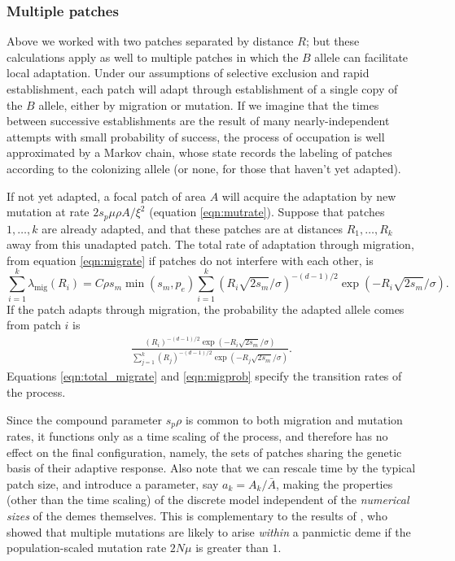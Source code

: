 \documentclass{article}
\newcommand{\linelabel}[1]{}
\newcommand{\migrate}{\lambda_\text{mig}}
\begin{document}
\subsubsection{Multiple patches}
Above we worked with two patches separated by distance $R$;
but these calculations apply as well to multiple patches
in which the $B$ allele can facilitate local adaptation. 
Under our assumptions of selective exclusion and rapid establishment, 
each patch will adapt through establishment of a single copy of the $B$ allele, 
either by migration or mutation.
If we imagine that the times between successive establishments are the result of many nearly-independent attempts
with small probability of success,
the process of occupation is well approximated by a Markov chain,
whose state records the labeling of patches according to the colonizing allele
(or none, for those that haven't yet adapted).

If not yet adapted, a focal patch of area $A$ will acquire the adaptation by new mutation at rate $2 s_p \mu \rho A/\xi^2$ (equation \eqref{eqn:mutrate}).
Suppose that patches $1, \ldots, k$ are already adapted,
and that these patches are at distances $R_1, \ldots, R_k$ away from this unadapted patch.
The total rate of adaptation through migration, from equation \eqref{eqn:migrate}
if patches do not interfere with each other, \linelabel{rr:interference}
is
\begin{equation} \label{eqn:total_migrate}
    \sum_{i=1}^k \migrate(R_i) = C \rho s_m \min(s_m,p_e) \sum_{i=1}^{k} \left(R_i \sqrt{2 s_m} /\sigma \right)^{-(d-1)/2} \exp\left(- R_i \sqrt{2 s_m} /\sigma\right).
\end{equation}
If the patch adapts through migration, the probability the adapted allele 
comes from patch $i$ is 
\begin{align}   \label{eqn:migprob}
  \frac{
      \left(R_i \right)^{-(d-1)/2} \exp\left(- R_i \sqrt{2 s_m} 
      /\sigma\right)
  } {
      \sum_{j=1}^{k}  \left(R_j \right)^{-(d-1)/2} \exp\left(- R_j \sqrt{2 s_m}
    /\sigma\right) 
} .
\end{align}
Equations \eqref{eqn:total_migrate} and \eqref{eqn:migprob} specify the transition rates of the process.

Since the compound parameter $s_p \rho$ is common to both migration and mutation rates,
it functions only as a time scaling of the process, 
and therefore has no effect on the final configuration, namely, 
the sets of patches sharing the genetic basis of their adaptive response.
Also note that we can rescale time by the typical patch size, and introduce a parameter, say $a_k = A_k/\bar A$,
making the properties (other than the time scaling) of the discrete model independent of the \emph{numerical sizes} of the demes themselves.
This is complementary to the results of \cite{softsweepsII}, who showed that multiple mutations are likely to arise \emph{within} a panmictic deme
if the population-scaled mutation rate $2 N \mu$ is greater than $1$.
\end{document}
